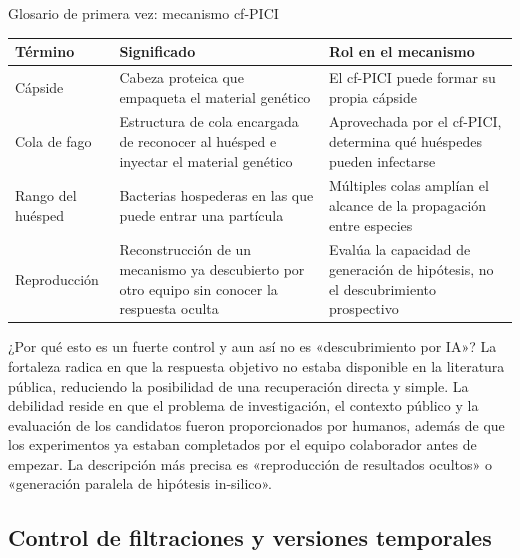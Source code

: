 \begin{knowledgebox}{Glosario de primera vez: mecanismo cf-PICI}
\begin{tabularx}{\textwidth}{L{0.22\textwidth}X X}
\toprule
Término & Significado & Rol en el mecanismo \\
\midrule
Cápside & Cabeza proteica que empaqueta el material genético & El cf-PICI puede formar su propia cápside \\
Cola de fago & Estructura de cola encargada de reconocer al huésped e inyectar el material genético & Aprovechada por el cf-PICI, determina qué huéspedes pueden infectarse \\
Rango del huésped & Bacterias hospederas en las que puede entrar una partícula & Múltiples colas amplían el alcance de la propagación entre especies \\
Reproducción & Reconstrucción de un mecanismo ya descubierto por otro equipo sin conocer la respuesta oculta & Evalúa la capacidad de generación de hipótesis, no el descubrimiento prospectivo \\
\bottomrule
\end{tabularx}
\end{knowledgebox}


\begin{warningbox}{¿Por qué esto es un fuerte control y aun así no es «descubrimiento por IA»?}
La fortaleza radica en que la respuesta objetivo no estaba disponible en la literatura pública, reduciendo la posibilidad de una recuperación directa y simple. La debilidad reside en que el problema de investigación, el contexto público y la evaluación de los candidatos fueron proporcionados por humanos, además de que los experimentos ya estaban completados por el equipo colaborador antes de empezar. La descripción más precisa es «reproducción de resultados ocultos» o «generación paralela de hipótesis in-silico».
\end{warningbox}

\subsection{Control de filtraciones y versiones temporales}

